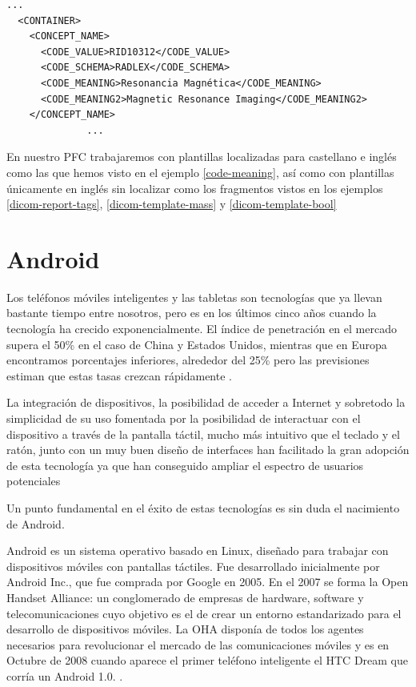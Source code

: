 \lstset{escapechar=@,style=dicom}
\renewcommand*\lstlistingname{Código}
\begin{lstlisting}[label=code-meaning,caption=Internacionación y localización en ficheros DICOM-SR.]
		  ...
  <CONTAINER>
    <CONCEPT_NAME>
      <CODE_VALUE>RID10312</CODE_VALUE>
      <CODE_SCHEMA>RADLEX</CODE_SCHEMA>
      <CODE_MEANING>Resonancia Magnética</CODE_MEANING>
      <CODE_MEANING2>Magnetic Resonance Imaging</CODE_MEANING2>
    </CONCEPT_NAME>
              ...
\end{lstlisting}


En nuestro PFC trabajaremos con plantillas localizadas para castellano e inglés como las que hemos visto en el ejemplo \ref{code-meaning}, así como con plantillas únicamente en inglés sin localizar como los fragmentos vistos en los ejemplos \ref{dicom-report-tags}, \ref{dicom-template-mass} y \ref{dicom-template-bool}

\section{Android}
Los teléfonos móviles inteligentes y las tabletas son tecnologías que ya llevan bastante tiempo entre nosotros, pero es en los últimos cinco años cuando la tecnología ha crecido exponencialmente. El índice de penetración en el mercado supera el 50\% en el caso de China y Estados Unidos, mientras que en Europa encontramos porcentajes inferiores, alrededor del 25\% pero las previsiones estiman que estas tasas crezcan rápidamente \cite{wiki:smartphones}.\par
La integración de dispositivos, la posibilidad de acceder a Internet y sobretodo la simplicidad de su uso fomentada por la posibilidad de interactuar con el dispositivo a través de la pantalla táctil, mucho más intuitivo que el teclado y el ratón, junto con un muy buen diseño de interfaces han facilitado la gran adopción de esta tecnología ya que han conseguido ampliar el espectro de usuarios potenciales\medskip\par

Un punto fundamental en el éxito de estas tecnologías es sin duda el nacimiento de Android.\par
Android es un sistema operativo basado en Linux, diseñado para trabajar con dispositivos móviles con pantallas táctiles. Fue desarrollado inicialmente por Android Inc., que fue comprada por Google en 2005. En el 2007 se forma la Open Handset Alliance: un conglomerado de empresas de hardware, software y telecomunicaciones cuyo objetivo es el de crear un entorno estandarizado para el desarrollo de dispositivos móviles. La OHA disponía de todos los agentes necesarios para revolucionar el mercado de las comunicaciones móviles y es en Octubre de 2008 cuando aparece el primer teléfono inteligente el HTC Dream que corría un Android 1.0. \cite{wiki:android}.\medskip\par

